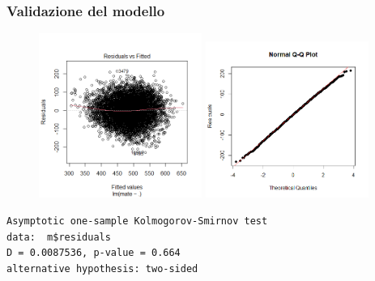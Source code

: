 \documentclass{beamer}
\begin{document}
\begin{frame}[fragile]
\frametitle{Validazione del modello}
\begin{figure}
\includegraphics[width=0.475\textwidth]{omosc1}
\hfill
\includegraphics[width=0.475\textwidth]{norm1}
\end{figure}
{\scriptsize
\begin{verbatim}
Asymptotic one-sample Kolmogorov-Smirnov test
data:  m$residuals
D = 0.0087536, p-value = 0.664
alternative hypothesis: two-sided
\end{verbatim}
}
\end{frame}


\end{document}
